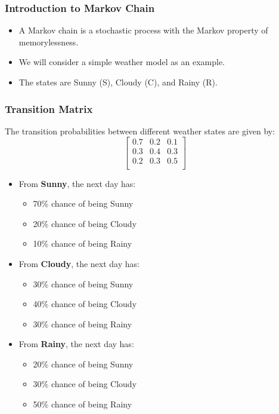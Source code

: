 \documentclass[aspectratio=169]{beamer}
\begin{document}
\begin{frame}
\frametitle{Introduction to Markov Chain}
\begin{itemize}
    \item A Markov chain is a stochastic process with the Markov property of memorylessness.
    \item We will consider a simple weather model as an example.
    \item The states are Sunny (S), Cloudy (C), and Rainy (R).
\end{itemize}
\end{frame}

\begin{frame}
\frametitle{Transition Matrix}
The transition probabilities between different weather states are given by:
\[
\begin{bmatrix}
0.7 & 0.2 & 0.1 \\
0.3 & 0.4 & 0.3 \\
0.2 & 0.3 & 0.5 \\
\end{bmatrix}
\]
\begin{itemize}
    \item From \textbf{Sunny}, the next day has:
    \begin{itemize}
        \item 70\% chance of being Sunny
        \item 20\% chance of being Cloudy
        \item 10\% chance of being Rainy
    \end{itemize}
    \item From \textbf{Cloudy}, the next day has:
    \begin{itemize}
        \item 30\% chance of being Sunny
        \item 40\% chance of being Cloudy
        \item 30\% chance of being Rainy
    \end{itemize}
    \item From \textbf{Rainy}, the next day has:
    \begin{itemize}
        \item 20\% chance of being Sunny
        \item 30\% chance of being Cloudy
        \item 50\% chance of being Rainy
    \end{itemize}
\end{itemize}
\end{frame}
\end{document}
